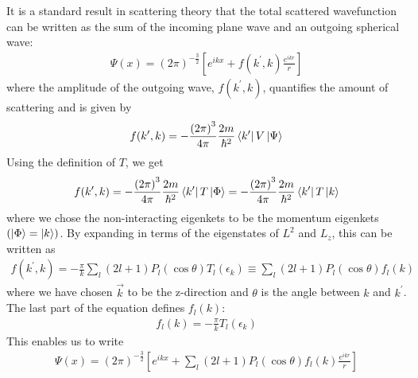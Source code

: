 \documentclass[twoside,11pt]{report}
\numberwithin{equation}{section}
\begin{document}
It is a standard result in scattering theory that the total scattered wavefunction can be written as the sum of the incoming plane wave and an outgoing spherical wave:
\begin{equation}\begin{aligned}
	\Psi(x) = \left(2\pi\right)^{-\frac{3}{2}}\left[e^{ikx} + f(k^\prime, k) \frac{e^{ikr}}{r}\right]
\end{aligned}\end{equation}
where the amplitude of the outgoing wave, \(f(k^\prime,k)\), quantifies the amount of scattering and is given by
\begin{equation}\begin{aligned}
	f(k^\prime, k) = - \frac{\left( 2\pi \right) ^3}{4\pi} \frac{2m}{\hbar^2}\bra{k^\prime}V\ket{\Psi}
\end{aligned}\end{equation}
Using the definition of \(T\), we get
\begin{equation}\begin{aligned}
\label{f_in_T}
f(k^\prime,k) = - \frac{\left( 2\pi \right) ^3}{4\pi} \frac{2m}{\hbar^2}\bra{k^\prime}T\ket{\Phi} = -\frac{\left( 2\pi \right) ^3}{4\pi} \frac{2m}{\hbar^2}\bra{k^\prime}T\ket{k}
\end{aligned}\end{equation}
where we chose the non-interacting eigenkets to be the momentum eigenkets \(\left( \ket{\Phi} = \ket{k} \right) \). By expanding in terms of the eigenstates of \(L^2\) and \(L_z\), this can be written as
\begin{equation}\begin{aligned}
	f(k^\prime,k) = - \frac{\pi}{k}\sum_l (2l+1)P_l\left( \cos \theta \right) T_l(\epsilon_k) \equiv \sum_l (2l+1)P_l\left( \cos \theta \right) f_l\left( k \right) 
\end{aligned}\end{equation}
where we have chosen \(\vec k\) to be the z-direction and \(\theta\) is the angle between \(k\) and \(k^\prime\). The last part of the equation defines \(f_l(k)\):
\begin{equation}\begin{aligned}
	f_l(k) = - \frac{\pi}{k} T_l(\epsilon_k)
\end{aligned}\end{equation}
This enables us to write
\begin{equation}\begin{aligned}
	\Psi(x) = \left(2\pi\right)^{-\frac{3}{2}}\left[e^{ikx} + \sum_l (2l+1)P_l\left( \cos \theta \right) f_l\left(k\right) \frac{e^{ikr}}{r}\right]
\end{aligned}\end{equation}
\end{document}
